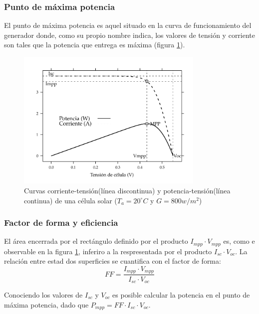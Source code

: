 \subsubsection{Punto de máxima potencia}
\label{sec:orga2b9043}
El punto de máxima potencia es aquel situado en la curva de funcionamiento del generador donde, como su propio nombre indica, los valores de tensión y corriente son tales que la potencia que entrega es máxima (figura \ref{fig:orgbe91e7a}).
\begin{figure}[]
\centering
\includegraphics[keepaspectratio,width=0.8\textwidth,height=0.5\textheight]{figuras/CurvaIV_Ta20_G800.pdf}
\caption{\label{fig:orgbe91e7a}Curvas corriente-tensión(línea discontinua) y potencia-tensión(línea continua) de una célula solar (\(T_a=20^\circ C\) y \(G=800 w/m^2\))}
\end{figure}

\subsubsection{Factor de forma y eficiencia}
\label{sec:org20bad8b}
El área encerrada por el rectángulo definido por el producto \(I_{mpp}\cdot V_{mpp}\) es, como e observable en la figura \ref{fig:orgbe91e7a}, inferiro a la respresentada por el producto \(I_{sc}\cdot V_{oc}\). La relación entre estad dos superficies se cuantifica con el factor de forma:
\begin{equation}
FF=\frac{I_{mpp}\cdot V_{mpp}}{I_{sc}\cdot V_{oc}}
\label{eq:factor-forma}
\end{equation}

Conociendo los valores de \(I_{sc}\) y \(V_{oc}\) es posible calcular la potencia en el punto de máxima potencia, dado que \(P_{mpp}=FF\cdot I_{sc}\cdot V_{oc}\).


